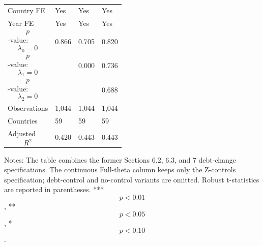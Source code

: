 \begin{table}[H]
\begin{threeparttable}
\begin{tabularx}{\textwidth}{lYYY}
Country FE & Yes & Yes & Yes \\
Year FE & Yes & Yes & Yes \\
$$p$$-value: $$\lambda_0=0$$ & 0.866 & 0.705 & 0.820 \\
$$p$$-value: $$\lambda_1=0$$ &  & 0.000 & 0.736 \\
$$p$$-value: $$\lambda_2=0$$ &  &  & 0.688 \\
Observations & 1,044 & 1,044 & 1,044 \\
Countries & 59 & 59 & 59 \\
Adjusted $$R^2$$ & 0.420 & 0.443 & 0.443 \\
\bottomrule
\end{tabularx}
\begin{tablenotes}[flushleft]\footnotesize
\item Notes: The table combines the former Sections 6.2, 6.3, and 7 debt-change specifications. The continuous Full-theta column keeps only the Z-controls specification; debt-control and no-control variants are omitted. Robust t-statistics are reported in parentheses. *** $$p<0.01$$, ** $$p<0.05$$, * $$p<0.10$$.
\end{tablenotes}
\end{threeparttable}
\end{table}
